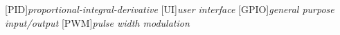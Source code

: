 \begin{acronym}
    [PID]{\textit{proportional-integral-derivative}}
    [UI]{\textit{user interface}}
    [GPIO]{\textit{general purpose input/output}}
    [PWM]{\textit{pulse width modulation}}
\end{acronym}

